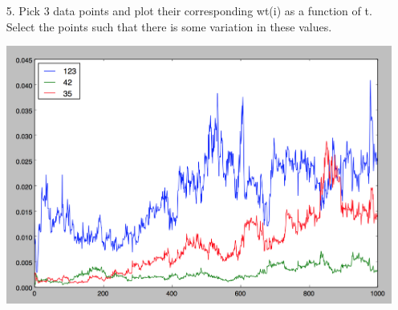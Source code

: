 \documentclass[11pt]{article}
\begin{document}
\begin{enumerate}
\item[5.] Pick 3 data points and plot their corresponding wt(i) as a function of t. Select the points such that there is some variation in these values.

\includegraphics[scale=.5]{images/p3w.png}

\end{enumerate}
\end{document}
